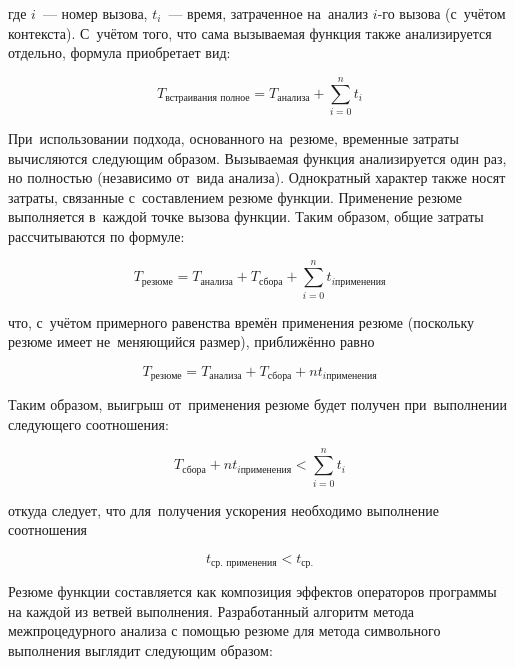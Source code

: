 где $i$~--- номер вызова, $t_i$~--- время, затраченное на~анализ $i$-го вызова (с~учётом контекста). С~учётом того, что сама вызываемая функция также анализируется отдельно, формула приобретает вид:

\begin{equation}
 T_{\text{встраивания полное}} = T_{\text{анализа}} + \sum_{i = 0}^{n} t_i 
\end{equation}

При~использовании подхода, основанного на~резюме, временные затраты вычисляются следующим образом. Вызываемая функция анализируется один раз, но полностью (независимо от~вида анализа). Однократный характер также носят затраты, связанные с~составлением резюме функции. Применение резюме выполняется в~каждой точке вызова функции. Таким образом, общие затраты рассчитываются по формуле:

\begin{equation}
 T_{\text{резюме}} = T_{\text{анализа}} + T_{\text{сбора}} + \sum_{i = 0}^{n} t_{i \text{применения}}
\end{equation}

что, с~учётом примерного равенства времён применения резюме (поскольку резюме имеет не~меняющийся размер), приближённо равно


\begin{equation}
 T_{\text{резюме}} = T_{\text{анализа}} + T_{\text{сбора}} + n t_{i \text{применения}}
\end{equation}

Таким образом, выигрыш от~применения резюме будет получен при~выполнении следующего соотношения:

\begin{equation}
 T_{\text{сбора}} + n t_{i \text{применения}} < \sum_{i = 0}^{n} t_{i}
\end{equation}

откуда следует, что для~получения ускорения необходимо выполнение соотношения

\begin{equation}
 t_{\text{ср. применения}} <  t_{\text{ср.}}
\end{equation}


Резюме функции составляется как композиция эффектов операторов программы на каждой из ветвей выполнения. Разработанный алгоритм метода межпроцедурного анализа с помощью резюме для метода символьного выполнения выглядит следующим образом:

